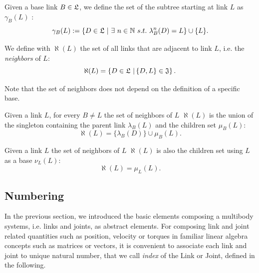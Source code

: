 \begin{definition}
\label{def:subtreeLinks}
Given a base link $B \in \mathfrak{L}$, we define the set of the subtree starting at link $L$ as $\gamma_B(L)$ : 
\begin{equation}
\gamma_B(L) := \{ D \in \mathfrak{L} \  | \  \exists \ n \in \mathbb{N} \  s.t. \  \lambda_B^n(D) = L \} \cup \{ L \}.
\end{equation}
\end{definition}

\begin{definition}
We define with $\aleph(L)$ the set of all links that are adjacent to link $L$, i.e. the \emph{neighbors} of $L$:
\begin{equation}
\aleph(L) = \left\{ D \in \mathfrak{L} \ | \left\{D,L\right\} \in \mathfrak{J}  \right\}.
\end{equation}
\end{definition}
Note that the set of neighbors does not depend on the definition of a specific base.


\begin{lemma}
Given a link $L$, for every $B \neq L$ the set of neighbors of $L$ $\aleph(L)$ is the union of the singleton containing the parent link $\lambda_B(L)$ and the children set $\mu_B(L)$:
\begin{equation}
\aleph(L) = \{ \lambda_B(D) \} \cup \mu_B(L).
\end{equation}
\end{lemma}

\begin{lemma}
Given a link $L$ the set of neighbors of $L$ $\aleph(L)$ is also the children set using $L$ as a base $\nu_L(L)$:
\begin{equation}
\aleph(L) = \mu_L(L).
\end{equation}
\end{lemma}




\subsection{Numbering}
In the previous section, we introduced the basic elements composing a multibody systems, i.e. links and joints, as abstract elements. For composing link and joint related quantities such as position, velocity or torques in familiar linear algebra concepts such as matrices or vectors, it is convenient to associate each link and joint to unique natural number, that we call \emph{index} of the Link or Joint, defined in the following.

